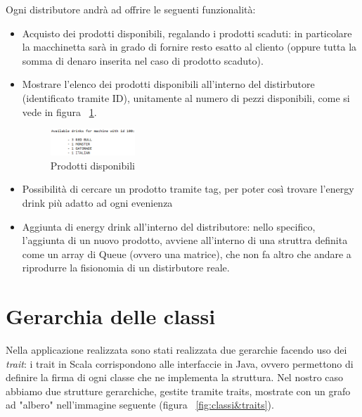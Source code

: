 Ogni distributore andrà ad offrire le seguenti funzionalità:
\begin{itemize}
	\item Acquisto dei prodotti disponibili, regalando i prodotti scaduti: in particolare la macchinetta sarà in grado di fornire resto esatto al cliento (oppure tutta la somma di denaro inserita nel caso di prodotto scaduto).
	\item Mostrare l'elenco dei prodotti disponibili all'interno del distirbutore (identificato tramite ID), unitamente al numero di pezzi disponibili, come si vede in figura ~\ref{fig:AvailableProducts}.
	\begin{figure}[h]
		\centering
		\includegraphics[width=0.3\textwidth]{Immagini/ShowVendingMachine.png}
		\caption{Prodotti disponibili}
		\label{fig:AvailableProducts}
	\end{figure}
	\item Possibilità di cercare un prodotto tramite tag, per poter così trovare l'energy drink più adatto ad ogni evenienza
	\item Aggiunta di energy drink all'interno del distributore: nello specifico, l'aggiunta di un nuovo prodotto, avviene all'interno di una struttra definita come un array di Queue (ovvero una matrice), che non fa altro che andare a riprodurre la fisionomia di un distirbutore reale.
\end{itemize}

\section{Gerarchia delle classi}
Nella applicazione realizzata sono stati realizzata due gerarchie facendo uso dei \textit{trait}: i trait in Scala corrispondono alle interfaccie in Java, ovvero permettono di definire la firma di ogni classe che ne implementa la struttura.
Nel nostro caso abbiamo due strutture gerarchiche, gestite tramite traits, mostrate con un grafo ad "albero" nell'immagine seguente (figura ~\ref{fig:classi&traits}).

